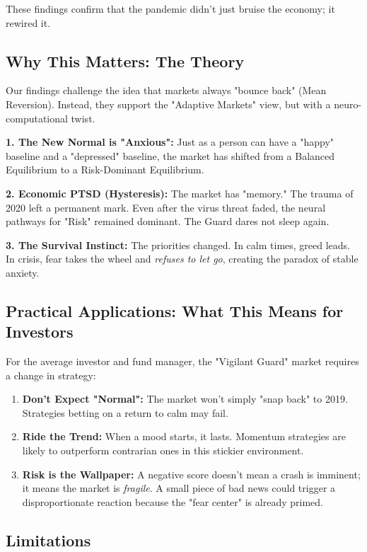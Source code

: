 \documentclass[conference]{IEEEtran}
\begin{document}
These findings confirm that the pandemic didn't just bruise the economy; it rewired it.

\subsection{Why This Matters: The Theory}

Our findings challenge the idea that markets always "bounce back" (Mean Reversion). Instead, they support the "Adaptive Markets" view, but with a neuro-computational twist.

\textbf{1. The New Normal is "Anxious":} Just as a person can have a "happy" baseline and a "depressed" baseline, the market has shifted from a Balanced Equilibrium to a Risk-Dominant Equilibrium.

\textbf{2. Economic PTSD (Hysteresis):} The market has "memory." The trauma of 2020 left a permanent mark. Even after the virus threat faded, the neural pathways for "Risk" remained dominant. The Guard dares not sleep again.

\textbf{3. The Survival Instinct:} The priorities changed. In calm times, greed leads. In crisis, fear takes the wheel and \textit{refuses to let go}, creating the paradox of stable anxiety.

\subsection{Practical Applications: What This Means for Investors}

For the average investor and fund manager, the "Vigilant Guard" market requires a change in strategy:
\begin{enumerate}
    \item \textbf{Don't Expect "Normal":} The market won't simply "snap back" to 2019. Strategies betting on a return to calm may fail.
    \item \textbf{Ride the Trend:} When a mood starts, it lasts. Momentum strategies are likely to outperform contrarian ones in this stickier environment.
    \item \textbf{Risk is the Wallpaper:} A negative score doesn't mean a crash is imminent; it means the market is \textit{fragile}. A small piece of bad news could trigger a disproportionate reaction because the "fear center" is already primed.
\end{enumerate}

\subsection{Limitations}
\end{document}
